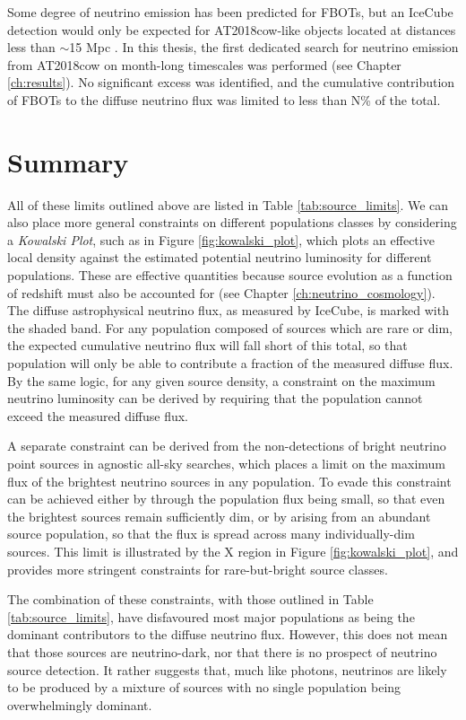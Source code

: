 Some degree of neutrino emission has been predicted for FBOTs, but an IceCube detection would only be expected for AT2018cow-like objects located at distances less than $\sim$15 Mpc . In this thesis, the first dedicated search for neutrino emission from AT2018cow on month-long timescales was performed (see Chapter \ref{ch:results}). No significant excess was identified, and the cumulative contribution of FBOTs to the diffuse neutrino flux was limited to less than N\% of the total.

\section{Summary}

All of these limits outlined above are listed in Table \ref{tab:source_limits}. We can also place more general constraints on different populations classes by considering a \emph{Kowalski Plot}, such as in Figure \ref{fig:kowalski_plot}, which plots an effective local density against the estimated potential neutrino luminosity for different populations. These are effective quantities because source evolution as a function of redshift must also be accounted for (see Chapter \ref{ch:neutrino_cosmology}). The diffuse astrophysical neutrino flux, as measured by IceCube, is marked with the shaded band. For any population composed of sources which are rare or dim, the expected cumulative neutrino flux will fall short of this total, so that population will only be able to contribute a fraction of the measured diffuse flux. By the same logic, for any given source density, a constraint on the maximum neutrino luminosity can be derived by requiring that the population cannot exceed the measured diffuse flux.

A separate constraint can be derived from the non-detections of bright neutrino point sources in agnostic all-sky searches\cite{ic_ps_10_yr}, which places a limit on the maximum flux of the brightest neutrino sources in any population. To evade this constraint can be achieved either by through the population flux being small, so that even the brightest sources remain sufficiently dim, or by arising from an abundant source population, so that the flux is spread across many individually-dim sources. This limit is illustrated by the X region in Figure \ref{fig:kowalski_plot}, and provides more stringent constraints for rare-but-bright source classes.

The combination of these constraints, with those outlined in Table \ref{tab:source_limits}, have disfavoured most major populations as being the dominant contributors to the diffuse neutrino flux. However, this does not mean that those sources are neutrino-dark, nor that there is no prospect of neutrino source detection. It rather suggests that, much like photons, neutrinos are likely to be produced by a mixture of sources with no single population being overwhelmingly dominant. 

